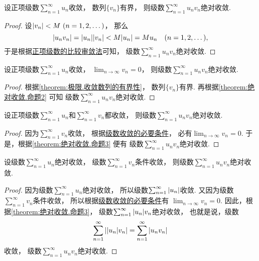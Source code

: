 \begin{proposition}\label{theorem:绝对收敛.命题2}
设正项级数\(\sum_{n=1}^\infty u_n\)收敛，
数列\(\{v_n\}\)有界，
则级数\(\sum_{n=1}^\infty u_n v_n\)绝对收敛.
\begin{proof}
设\(\abs{v_n} < M\ (n=1,2,\dotsc)\)，
那么\[
	\abs{u_n v_n}
	= \abs{u_n} \abs{v_n}
	< M \abs{u_n}
	= M u_n
	\quad(n=1,2,\dotsc),
\]
于是根据\hyperref[theorem:无穷级数.正项级数的比较审敛法的推论]{正项级数的比较审敛法}可知，
级数\(\sum_{n=1}^\infty u_n v_n\)绝对收敛.
\end{proof}
\end{proposition}

\begin{proposition}\label{theorem:绝对收敛.命题3}
设正项级数\(\sum_{n=1}^\infty u_n\)收敛，
\(\lim_{n\to\infty} v_n = 0\)，
则级数\(\sum_{n=1}^\infty u_n v_n\)绝对收敛.
\begin{proof}
根据\cref{theorem:极限.收敛数列的有界性}，
数列\(\{v_n\}\)有界.
再根据\cref{theorem:绝对收敛.命题2} 可知
级数\(\sum_{n=1}^\infty u_n v_n\)绝对收敛.
\end{proof}
\end{proposition}

\begin{proposition}\label{theorem:绝对收敛.命题4}
设正项级数\(\sum_{n=1}^\infty u_n\)和\(\sum_{n=1}^\infty v_n\)都收敛，
则级数\(\sum_{n=1}^\infty u_n v_n\)绝对收敛.
\begin{proof}
因为\(\sum_{n=1}^\infty v_n\)收敛，
根据\hyperref[theorem:无穷级数.级数收敛的必要条件]{级数收敛的必要条件}，
必有\(\lim_{n\to\infty} v_n = 0\).
于是，根据\cref{theorem:绝对收敛.命题3} 便有
级数\(\sum_{n=1}^\infty u_n v_n\)绝对收敛.
\end{proof}
\end{proposition}

\begin{proposition}\label{theorem:绝对收敛.命题5}
设级数\(\sum_{n=1}^\infty u_n\)绝对收敛，
级数\(\sum_{n=1}^\infty v_n\)条件收敛，
则级数\(\sum_{n=1}^\infty u_n v_n\)绝对收敛.
\begin{proof}
因为级数\(\sum_{n=1}^\infty u_n\)绝对收敛，
所以级数\(\sum_{n=1}^\infty \abs{u_n}\)收敛.
又因为级数\(\sum_{n=1}^\infty v_n\)条件收敛，
所以根据\hyperref[theorem:无穷级数.级数收敛的必要条件]{级数收敛的必要条件}有
\(\lim_{n\to\infty} v_n = 0\).
因此，根据\cref{theorem:绝对收敛.命题3}，
级数\(\sum_{n=1}^\infty \abs{u_n} v_n\)绝对收敛，
也就是说，级数\[
	\sum_{n=1}^\infty \abs{\abs{u_n} v_n}
	= \sum_{n=1}^\infty \abs{u_n v_n}
\]收敛，
级数\(\sum_{n=1}^\infty u_n v_n\)绝对收敛.
\end{proof}
\end{proposition}


